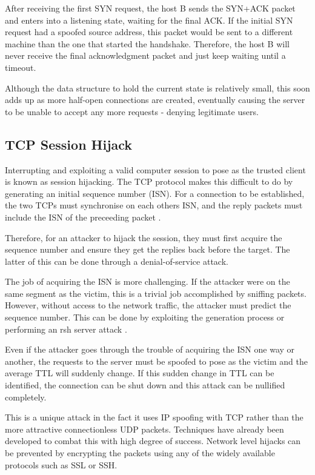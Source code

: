 \documentclass[twocolumn,10pt]{asme2ej}
\begin{document}
After receiving the first SYN request, the host B sends the SYN+ACK packet and enters into a listening state, waiting for the final ACK. If the initial SYN request had a spoofed source address, this packet would be sent to a different machine than the one that started the handshake. Therefore, the host B will never receive the final acknowledgment packet and just keep waiting until a timeout. 

Although the data structure to hold the current state is relatively small, this soon adds up as more half-open connections are created, eventually causing the server to be unable to accept any more requests - denying legitimate users.

\subsection{TCP Session Hijack}
Interrupting and exploiting a valid computer session to pose as the trusted client is known as session hijacking. The TCP protocol makes this difficult to do by generating an initial sequence number (ISN). For a connection to be established, the two TCPs must synchronise on each others ISN, and the reply packets must include the ISN of the preceeding packet \cite{rfc793}. 

Therefore, for an attacker to hijack the session, they must first acquire the sequence number and ensure they get the replies back before the target. The latter of this can be done through a denial-of-service attack. 

The job of acquiring the ISN is more challenging. If the attacker were on the same segment as the victim, this is a trivial job accomplished by sniffing packets. However, without access to the network traffic, the attacker must predict the sequence number. This can be done by exploiting the generation process or performing an rsh server attack \cite{tcphijacking}.

Even if the attacker goes through the trouble of acquiring the ISN one way or another, the requests to the server must be spoofed to pose as the victim and the average TTL will suddenly change. If this sudden change in TTL can be identified, the connection can be shut down and this attack can be nullified completely.

This is a unique attack in the fact it uses IP spoofing with TCP rather than the more attractive connectionless UDP packets. Techniques have already been developed to combat this with high degree of success. Network level hijacks can be prevented by encrypting the packets using any of the widely available protocols such as SSL or SSH.
\end{document}
